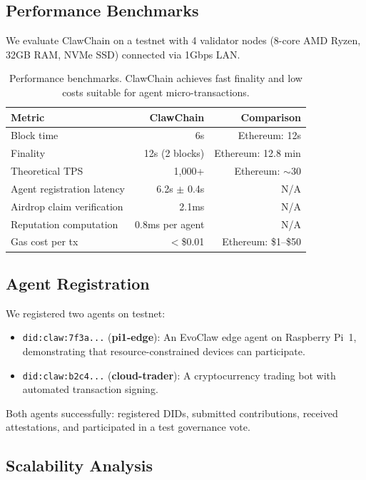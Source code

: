\documentclass{article}
\begin{document}
\subsection{Performance Benchmarks}

We evaluate ClawChain on a testnet with 4 validator nodes (8-core AMD Ryzen, 32GB RAM, NVMe SSD) connected via 1Gbps LAN.

\begin{table}[t]
\centering
\begin{tabular}{lrr}
\toprule
\textbf{Metric} & \textbf{ClawChain} & \textbf{Comparison} \\
\midrule
Block time & 6s & Ethereum: 12s \\
Finality & 12s (2 blocks) & Ethereum: 12.8 min \\
Theoretical TPS & 1,000+ & Ethereum: $\sim$30 \\
Agent registration latency & 6.2s $\pm$ 0.4s & N/A \\
Airdrop claim verification & 2.1ms & N/A \\
Reputation computation & 0.8ms per agent & N/A \\
Gas cost per tx & $<$\$0.01 & Ethereum: \$1--\$50 \\
\bottomrule
\end{tabular}
\caption{Performance benchmarks. ClawChain achieves fast finality and low costs suitable for agent micro-transactions.}
\label{tab:performance}
\end{table}

\subsection{Agent Registration}

We registered two agents on testnet:
\begin{itemize}
    \item \texttt{did:claw:7f3a...} (\textbf{pi1-edge}): An EvoClaw edge agent on Raspberry Pi~1, demonstrating that resource-constrained devices can participate.
    \item \texttt{did:claw:b2c4...} (\textbf{cloud-trader}): A cryptocurrency trading bot with automated transaction signing.
\end{itemize}

Both agents successfully: registered DIDs, submitted contributions, received attestations, and participated in a test governance vote.

\subsection{Scalability Analysis}
\end{document}

